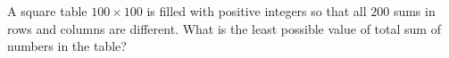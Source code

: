 \problem
A square table $100 \times 100$ is filled with positive integers so that all
$200$ sums in rows and columns are different.
What is the least possible value of total sum of numbers in the table?
\solution
\endproblem
